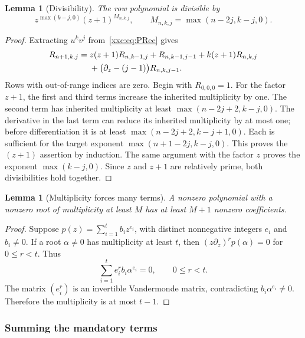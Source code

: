 \documentclass[11pt,a4paper]{article}
\numberwithin{equation}{section}
\newtheorem{lemma}[theorem]{Lemma}
\theoremstyle{definition}
\theoremstyle{remark}
\theoremstyle{plain}
\begin{document}
\begin{lemma}[Divisibility]\label{xxc:lem:divisibility}
The row polynomial is divisible by
\begin{equation}\label{xxc:eq:divisibility}
 z^{\max(k-j,0)}(z+1)^{M_{n,k,j}},
 \qquad M_{n,k,j}=\max(n-2j,k-j,0).
\end{equation}
\end{lemma}
\begin{proof}
Extracting $u^kv^j$ from~\eqref{xxc:eq:PRec} gives
\begin{align}\label{xxc:eq:rowrec}
 R_{n+1,k,j}={}&z(z+1)R_{n,k-1,j}+R_{n,k-1,j-1}
              +k(z+1)R_{n,k,j}\notag\\
 &+\bigl(\partial_z-(j-1)\bigr)R_{n,k,j-1}.
\end{align}
Rows with out-of-range indices are zero. Begin with $R_{0,0,0}=1$.
For the factor $z+1$, the first and third terms increase the inherited
multiplicity by one. The second term has inherited multiplicity at least
$\max(n-2j+2,k-j,0)$. The derivative in the last term can reduce its inherited
multiplicity by at most one; before differentiation it is at least
$\max(n-2j+2,k-j+1,0)$. Each is sufficient for the target exponent
$\max(n+1-2j,k-j,0)$. This proves the $(z+1)$ assertion by induction.
The same argument with the factor $z$ proves the exponent $\max(k-j,0)$.
Since $z$ and $z+1$ are relatively prime, both divisibilities hold together.
\end{proof}

\begin{lemma}[Multiplicity forces many terms]\label{xxc:lem:sparse}
A nonzero polynomial with a nonzero root of multiplicity at least $M$ has
at least $M+1$ nonzero coefficients.
\end{lemma}
\begin{proof}
Suppose $p(z)=\sum_{i=1}^t b_i z^{e_i}$, with distinct nonnegative integers
$e_i$ and $b_i\ne0$. If a root $\alpha\ne0$ has multiplicity at least $t$,
then $(z\partial_z)^r p(\alpha)=0$ for $0\le r<t$. Thus
\[
 \sum_{i=1}^t e_i^r b_i\alpha^{e_i}=0,\qquad 0\le r<t.
\]
The matrix $(e_i^r)$ is an invertible Vandermonde matrix, contradicting
$b_i\alpha^{e_i}\ne0$. Therefore the multiplicity is at most $t-1$.
\end{proof}

\subsubsection{Summing the mandatory terms}
\end{document}
